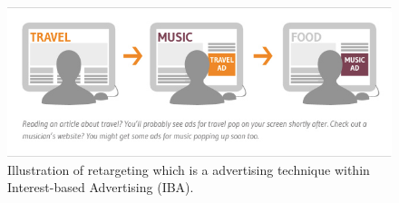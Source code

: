 \begin{figure}[h]
\centering
\includegraphics[width=\textwidth]{Chapters/Background/Interest_based_advertising}
\caption[Retargeting within Interest-based Advertising]{Illustration of retargeting which is a advertising technique within Interest-based Advertising (IBA).}
\label{fig:interestbasedadvertising}
\end{figure}


